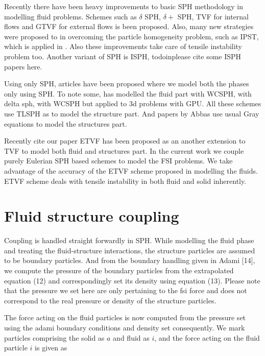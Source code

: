 \documentclass[preprint,12pt]{elsarticle}
\begin{document}
Recently there have been heavy improvements to basic SPH methodology in
modelling fluid problems. Schemes such as $\delta$ SPH, $\delta +$ SPH, TVF
for internal flows and GTVF for external flows is been proposed. Also, many
new strategies were proposed to in overcoming the particle homogeneity
problem, such as IPST, which is applied in \cite{IPST paper}. Also these
improvements take care of tensile instability problem too. Another variant of
SPH is ISPH, todoin{please cite some ISPH papers here}.


Using only SPH, articles have been proposed where we model both the phases
only using SPH. To note some, \citet{He2017coupled} has modelled the fluid
part with WCSPH, \citet{Sun2019study} with delta sph,
\citet{zhan2019stabilized} with WCSPH but applied to 3d problems with GPU. All
these schemes use TLSPH as to model the structure part. And papers by Abbas use
usual Gray equations to model the structures part.


Recently {cite our paper ETVF} has been proposed as an another extension to
TVF to model both fluid and structures part. In the current work we couple
purely Eulerian SPH based schemes to model the FSI problems. We take advantage
of the accuracy of the ETVF scheme proposed in modelling the fluids. ETVF
scheme deals with tensile instability in both fluid and solid inherently.




\section{Fluid structure coupling}
\label{sec:fsi-coupling}

Coupling is handled straight forwardly in SPH. While modelling the fluid phase
and treating the fluid-structure interactions, the structure particles are
assumed to be boundary particles. And from the boundary handling given in
Adami [14], we compute the pressure of the boundary particles from the
extrapolated equation (12) and correspondingly set its density using equation
(13). Please note that the pressure we set here are only pertaining to the fsi
force and does not correspond to the real pressure or density of the structure
particles.

The force acting on the fluid particles is now computed from the pressure set
using the adami boundary conditions and density set consequently. We mark
particles comprising the solid as $a$ and fluid as $i$, and the force acting
on the fluid particle $i$ is given as
\end{document}
